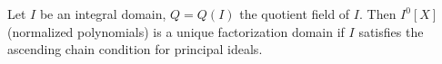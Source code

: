 Let $I$ be an integral domain, $Q = Q(I)$ the quotient field of $I$. Then $I^0[X]$ (normalized polynomials) is a unique factorization domain if $I$ satisfies the ascending chain condition for principal ideals.
